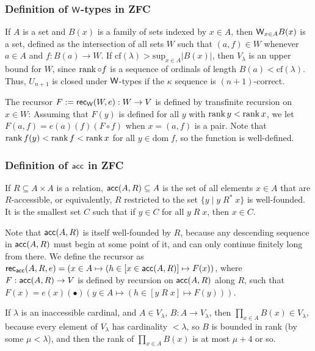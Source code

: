 \subsubsection{Definition of $\mathsf{W}$-types in ZFC}
If $A$ is a set and $B(x)$ is a family of sets indexed by $x\in A$, then $\mathsf{W}_{x\in A}B(x)$ is a set, defined as the intersection of all sets $W$ such that $(a,f)\in W$ whenever $a\in A$ and $f:B(a)\to W$. If $\mathrm{cf}(\lambda)>\mathrm{sup}_{x\in A}|B(x)|$, then $V_\lambda$ is an upper bound for $W$, since $\operatorname{rank}\circ f$ is a sequence of ordinals of length $B(a)<\mathrm{cf}(\lambda)$. Thus, $U_{n+1}$ is closed under $\mathsf{W}$-types if the $\kappa$ sequence is $(n+1)$-correct.

The recursor $F:=\mathsf{rec}_{\mathsf{W}}(W,e):W\to V$ is defined by transfinite recursion on $x\in W$: Assuming that $F(y)$ is defined for all $y$ with $\operatorname{rank} y<\operatorname{rank} x$, we let $F(a,f)=e(a)(f)(F\circ f)$ when $x=(a,f)$ is a pair. Note that $\operatorname{rank} f(y)<\operatorname{rank} f<\operatorname{rank} x$ for all $y\in\mathrm{dom}\;f$, so the function is well-defined.

\subsubsection{Definition of $\mathsf{acc}$ in ZFC}
If $R\subseteq A\times A$ is a relation, $\mathsf{acc}(A,R)\subseteq A$ is the set of all elements $x\in A$ that are $R$-accessible, or equivalently, $R$ restricted to the set $\{y\mid y\;R^*\;x\}$ is well-founded. It is the smallest set $C$ such that if $y\in C$ for all $y\;R\;x$, then $x\in C$.

Note that $\mathsf{acc}(A,R)$ is itself well-founded by $R$, because any descending sequence in $\mathsf{acc}(A,R)$ must begin at some point of it, and can only continue finitely long from there. We define the recursor as $\mathsf{rec}_{\mathsf{acc}}(A,R,e)=(x\in A\mapsto (h\in [x\in\mathsf{acc}(A,R)]\mapsto F(x))$, where $F:\mathsf{acc}(A,R)\to V$ is defined by recursion on $\mathsf{acc}(A,R)$ along $R$, such that $F(x)=e(x)(\bullet)(y\in A\mapsto (h\in[y\;R\;x]\mapsto F(y)))$.

\begin{remark}\label{rem:inacc_dprod}
If $\lambda$ is an inaccessible cardinal, and $A\in V_\lambda$, $B:A\to V_\lambda$, then $\prod_{x\in A} B(x)\in V_\lambda$, because every element of $V_\lambda$ has cardinality $<\lambda$, so $B$ is bounded in rank (by some $\mu<\lambda$), and then the rank of $\prod_{x\in A} B(x)$ is at most $\mu+4$ or so.
\end{remark}

